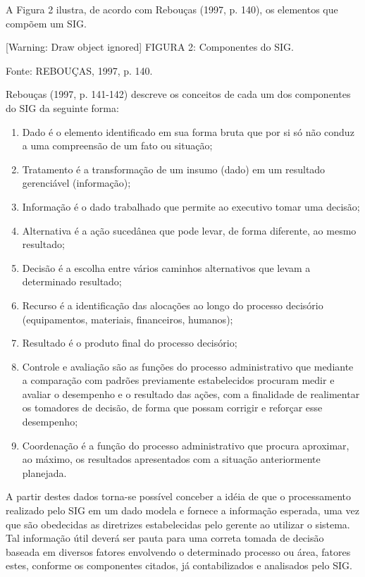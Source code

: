 \documentclass[a4paper]{article}
\newcommand\liststyleWWviiiNumxviii{%
\renewcommand\theenumi{\alph{enumi}}
\renewcommand\theenumii{\alph{enumii}}
\renewcommand\theenumiii{\roman{enumiii}}
\renewcommand\theenumiv{\arabic{enumiv}}
\renewcommand\labelenumi{\theenumi)}
\renewcommand\labelenumii{\theenumii.}
\renewcommand\labelenumiii{\theenumiii.}
\renewcommand\labelenumiv{\theenumiv.}
}
\begin{document}
{
\textsf{A Figura 2 ilustra, de acordo com Rebou\c{c}as (1997, p. 140), os elementos que comp\~oem um SIG.}}

{
[Warning: Draw object ignored]\newline
\textsf{\MakeUppercase{FIGURA }}\textsf{2: Componentes do SIG. }}

{\sffamily
Fonte: REBOU\c{C}AS, 1997, p. 140. }

{\sffamily
Rebou\c{c}as (1997, p. 141-142) descreve os conceitos de cada um dos componentes do SIG da seguinte forma:}

\liststyleWWviiiNumxviii
\begin{enumerate}
\item {
\textsf{Dado \'e o elemento identificado em sua forma bruta que por si s\'o n\~ao conduz a uma compreens\~ao de um fato
ou situa\c{c}\~ao;}}
\item {
\textsf{Tratamento \'e a transforma\c{c}\~ao de um insumo (dado) em um resultado gerenci\'avel (informa\c{c}\~ao);}}
\item {
\textsf{Informa\c{c}\~ao \'e o dado trabalhado que permite ao executivo tomar uma decis\~ao;}}
\item {
\textsf{Alternativa \'e a a\c{c}\~ao suced\^anea que pode levar, de forma diferente, ao mesmo resultado;}}
\item {
\textsf{Decis\~ao \'e a escolha entre v\'arios caminhos alternativos que levam a determinado resultado;}}
\item {
\textsf{Recurso \'e a identifica\c{c}\~ao das aloca\c{c}\~oes ao longo do processo decis\'orio (equipamentos, materiais,
financeiros, humanos);}}
\item {
\textsf{Resultado \'e o produto final do processo decis\'orio;}}
\item {
\textsf{Controle e avalia\c{c}\~ao s\~ao as fun\c{c}\~oes do processo administrativo que mediante a compara\c{c}\~ao com
padr\~oes previamente estabelecidos procuram medir e avaliar o desempenho e o resultado das a\c{c}\~oes, com a
finalidade de realimentar os tomadores de decis\~ao, de forma que possam corrigir e refor\c{c}ar esse desempenho;}}
\item {\sffamily
Coordena\c{c}\~ao \'e a fun\c{c}\~ao do processo administrativo que procura aproximar, ao m\'aximo, os resultados
apresentados com a situa\c{c}\~ao anteriormente planejada.}
\end{enumerate}
{
\textsf{A partir destes dados torna-se poss\'ivel conceber a id\'eia de que o processamento realizado pelo SIG em um
dado modela e fornece a informa\c{c}\~ao esperada, uma vez que s\~ao obedecidas as diretrizes estabelecidas pelo
gerente ao utilizar o sistema. Tal informa\c{c}\~ao \'util dever\'a ser pauta para uma correta tomada de decis\~ao
baseada em diversos fatores envolvendo o determinado processo ou \'area, fatores estes, conforme os componentes
citados, j\'a contabilizados e analisados pelo SIG. }}
\end{document}
